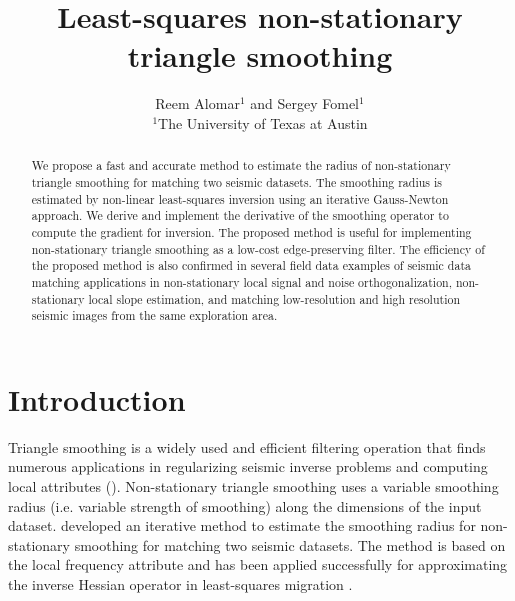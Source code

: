 
\title{Least-squares non-stationary triangle smoothing}

\author{Reem Alomar$^{1}$ and Sergey Fomel$^{1}$
\\
$^1$The University of Texas at Austin}


\maketitle

\begin{abstract}
  We propose a fast and accurate method to estimate the radius of non-stationary triangle smoothing for matching two seismic datasets. The smoothing radius is estimated by non-linear least-squares inversion using an iterative Gauss-Newton approach. We derive and implement the derivative of the smoothing operator to compute the gradient for inversion. The proposed method is useful for implementing non-stationary triangle smoothing as a low-cost edge-preserving filter. The efficiency of the proposed method is also confirmed in several field data examples of seismic data matching applications in non-stationary local signal and noise orthogonalization, non-stationary local slope estimation, and matching low-resolution and high resolution seismic images from the same exploration area.
\end{abstract}

\section{Introduction}
Triangle smoothing is a widely used and efficient filtering operation that finds numerous applications in regularizing seismic inverse problems and computing local attributes (\citealp{fomel2007a,fomel2007b}). Non-stationary triangle smoothing uses a variable smoothing radius (i.e. variable strength of smoothing) along the dimensions of the input dataset. \cite{greerfomel2018} developed an iterative method to estimate the smoothing radius for non-stationary smoothing for matching two seismic datasets. The method is based on the local frequency attribute and has been applied successfully for approximating the inverse Hessian operator in least-squares migration \cite[]{greer2018}. 

